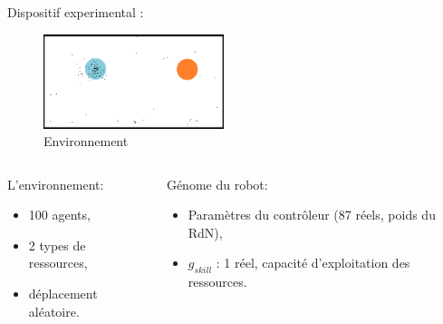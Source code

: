 \documentclass[8pt, handout=show,notes=show]{beamer}
\begin{document}
	
	
	

	
	\begin{frame}{Dispositif experimental :}
	\vfill
	\begin{figure}
	\includegraphics[height=2.75cm]{images/1roborob_sp_201106}
	\caption{Environnement}
	\end{figure}
	
	\begin{columns}[t]
	
	\begin{block}{L'environnement:}
	\begin{itemize}
		\item 100 agents, 
		\item 2 types de ressources, 
		\item déplacement aléatoire. 
	\end{itemize}
	\end{block}

	
	\begin{block}{Génome du robot:}
	\begin{itemize}
	\item Paramètres du contrôleur (87 réels, poids du RdN),
	\item $g_{skill}$ : 1 réel, capacité d'exploitation des ressources. 
	\end{itemize}
	\end{block}
	
	\end{columns}
	\vfill
	\end{frame}
	

	
	
\end{document}
